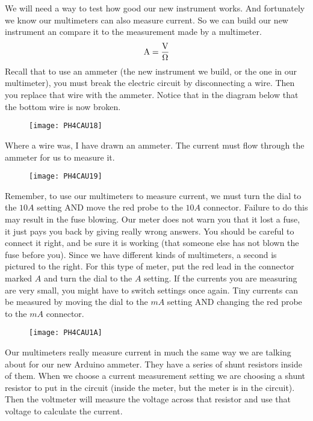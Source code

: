 We will need a way to test how good our new instrument works. And
fortunately we know our multimeters can also measure current. So we can
build our new instrument an compare it to the measurement made by a
multimeter. 
\begin{equation*}
\unit{A}=\frac{\unit{V}}{\unit{%
\Omega%
}}
\end{equation*}%
Recall that to use an ammeter (the new instrument we build, or the one in
our multimeter), you must break the electric circuit by disconnecting a
wire. Then you replace that wire with the ammeter. Notice that in the
diagram below that the bottom wire is now broken. \begin{figure}[h!]
\texttt{[image: PH4CAU18]}
\end{figure}Where a wire was, I have drawn an
ammeter. The current must flow through the ammeter for us to measure it.

\begin{figure}[h!]
\texttt{[image: PH4CAU19]}
\end{figure} Remember, to use our multimeters
to measure current, we must turn the dial to the $10\unit{A}$ setting AND
move the red probe to the $10\unit{A}$ connector. Failure to do this may
result in the fuse blowing. Our meter does not warn you that it lost a fuse,
it just pays you back by giving really wrong answers. You should be careful
to connect it right, and be sure it is working (that someone else has not
blown the fuse before you). Since we have different kinds of multimeters, a
second is pictured to the right. For this type of meter, put the red lead in
the connector marked $A$ and turn the dial to the $A$ setting. If the
currents you are measuring are very small, you might have to switch settings
once again. Tiny currents can be measured by moving the dial to the $\unit{mA%
}$ setting AND changing the red probe to the $\unit{mA}$ connector.\begin{figure}[h!]
\texttt{[image: PH4CAU1A]}
\end{figure}

Our multimeters really measure current in much the same way we are talking
about for our new Arduino ammeter. They have a series of shunt resistors
inside of them. When we choose a current measurement setting we are choosing
a shunt resistor to put in the circuit (inside the meter, but the meter is
in the circuit). Then the voltmeter will measure the voltage across that
resistor and use that voltage to calculate the current.

